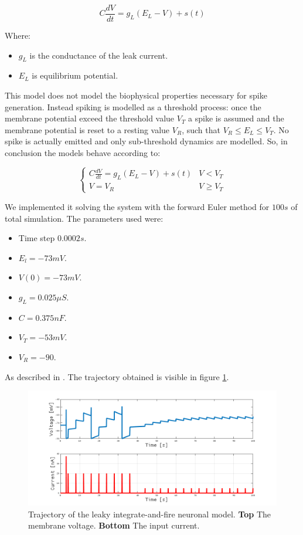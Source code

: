 		$$C\frac{dV}{dt} = g_L(E_L-V)+s(t)$$

		Where:

		\begin{itemize}
			\item $g_L$ is the conductance of the leak current.
			\item $E_L$ is equilibrium potential.
		\end{itemize}

		This model does not model the biophysical properties necessary for spike generation.
		Instead spiking is modelled as a threshold process: once the membrane potential exceed the threshold value $V_T$ a spike is assumed and the membrane potential is reset to a resting value $V_R$, such that $V_R\le E_L\le V_T$.
		No spike is actually emitted and only sub-threshold dynamics are modelled.
		So, in conclusion the models behave according to:

		$$\begin{cases}C\frac{dV}{dt} = g_L(E_L-V)+s(t) & V< V_T\\V = V_R & V\ge V_T\end{cases}$$

		We implemented it solving the system with the forward Euler method for $100s$ of total simulation.
		The parameters used were:

		\begin{multicols}{2}
			\begin{itemize}
				\item Time step $0.0002s$.
				\item $E_l = -73mV$.
				\item $V(0) = -73mV$.
				\item $g_L = 0.025\mu S$.
				\item $C = 0.375 nF$.
				\item $V_T = -53mV$.
				\item $V_R = -90$.
			\end{itemize}
		\end{multicols}

		As described in \cite{integrate-fire-params}.
		The trajectory obtained is visible in figure \ref{fig:integrate-fire}.

		\begin{figure}
			\includegraphics[width=\textwidth]{Figures/integrate-fire}
			\caption{Trajectory of the leaky integrate-and-fire neuronal model. \textbf{Top} The membrane voltage. \textbf{Bottom} The input current.}
			\label{fig:integrate-fire}
		\end{figure}

